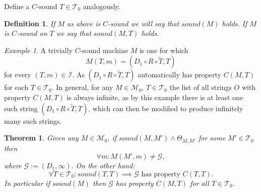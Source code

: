 \documentclass{amsart}  %
\numberwithin{equation}{section}
\newtheorem{theorem}[equation]{Theorem}
\newtheorem{lemma}[equation]{Lemma}
\newtheorem{definition}[equation]{Definition}
\theoremstyle{definition}
\theoremstyle{remark}
\newtheorem{example}[equation]{Example}
\begin{document}
{Define a $C$-sound $T \in \mathcal{T} _{0} $ analogously. 
\begin{definition}
 If $M$ as above is $C$-sound we will say that $sound (M)$ holds. If $M$ is $C$-sound on $T$ we say that $sound (M,T)$ holds.
\end{definition}
 \begin{example} \label{example:trivial}
A trivially $C$-sound machine $M$ is one for which $$M (T,m) =  (D_1 \circ R \circ  \widetilde{T}, T) $$ for every $(T,m) \in \mathcal{I} $. 
As $(D_1 \circ R \circ  \widetilde{T}, T) $ automatically has property $C (M,T)$ 
for each $T \in \mathcal{T}_{0} $.
In general, for any $M \in \mathcal{M} _{0} $, $T \in \mathcal{T} _{0} $ the list of all strings $O$ with property $C (M,T)$ is always infinite, as by this example there is at least one such string $(D_1 \circ R \circ  \widetilde{T}, T)$, which can then be modified to produce infinitely many such strings. 
 \end{example}      
%    
    \begin{theorem} \label{thm:diagonalization} Given any $M \in \mathcal{M} _{0} $, if  $sound (M,M') \land \Theta _{M,M'} $ for some $M' \in \mathcal{T} _{0} $ then 
   $$\forall m:  M (M',m) \neq \mathcal{G}, $$   
where $\mathcal{G}:= (D_1,\infty).$
On the other hand:
\begin{equation*}
\forall T \in \mathcal{T} _{0}: sound (T,T) \implies \text{$\mathcal{G}$ has property $C (T,T)$}.
\end{equation*}
In particular if $sound (M)$ then $\mathcal{G}$ has property $C (M,T)$ for all $T \in \mathcal{T} _{0} $.

\end{theorem}}
\end{document}
